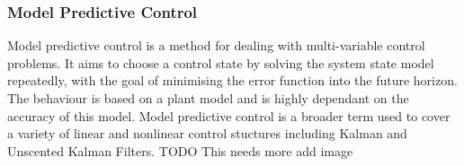 \documentclass[11pt,a4paper]{article}
\begin{document}
\subsubsection{Model Predictive Control}
\label{sub:model_predictive_control}
Model predictive control is a method for dealing with multi-variable control problems. It aims to choose a control state by solving the system state model repeatedly, with the goal of minimising the error function into the future horizon. The behaviour is based on a plant model and is highly dependant on the accuracy of this model. Model predictive control is a broader term used to cover a variety of linear and nonlinear control stuctures including Kalman and Unscented Kalman Filters.\newline
TODO This needs more add image
\newline %
\newline %
\newline %
\newline %
\newline %
\newline %
\newline %
\newline %
\newline %
\newline %
\newline %
\newline %
\newline %
\newline %
\newline %
\newline %
\newline %
\newline %
\newline %
\end{document}
